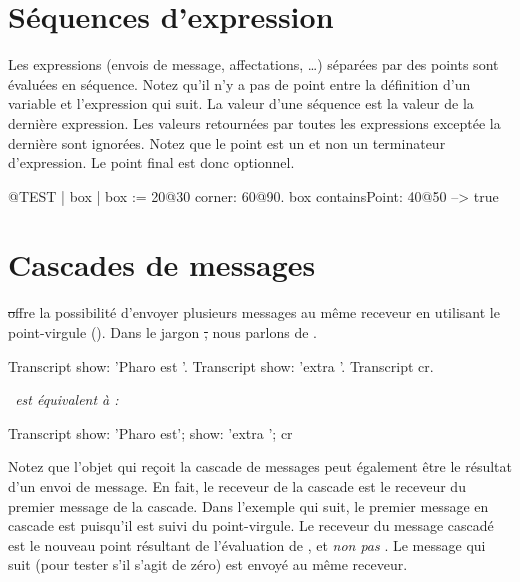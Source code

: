 \documentclass[a4paper,10pt,twoside]{book}
\begin{document}
\section{Séquences d'expression}
Les expressions (\ie envois de message, affectations, \ldots) séparées par des points sont évaluées en séquence.
Notez qu'il n'y a pas de point entre la définition d'un variable et l'expression qui suit.
La valeur d'une séquence est la valeur de la dernière
expression. Les valeurs retournées par toutes les expressions
exceptée la dernière sont ignorées. Notez que le point est un 
et non un terminateur d'expression. Le point final est donc optionnel.

\begin{code}{@TEST}
| box |
box := 20@30 corner: 60@90.
box containsPoint: 40@50 --> true
\end{code}

\section{Cascades de messages}
\st offre la possibilité d'envoyer plusieurs messages au même
receveur en utilisant le point-virgule (\ct{;}). Dans le jargon \st,
nous parlons de .


\begin{minipage}{0.35\textwidth}
\begin{code}{}
Transcript show: 'Pharo est '.
Transcript show: 'extra '.
Transcript cr.
\end{code}
\end{minipage}
\emph{~est équivalent à :~}
\begin{minipage}{0.35\textwidth}
\begin{code}{}
Transcript        
   show: 'Pharo est';
   show: 'extra ';
   cr
\end{code}
\end{minipage}

Notez que l'objet qui reçoit la cascade de messages peut également être le résultat d'un envoi de message.
En fait, le receveur de la cascade est le receveur du premier message
de la cascade. Dans l'exemple qui suit, le premier message en cascade
est  puisqu'il est suivi du point-virgule. Le receveur
du message cascadé  est le nouveau point résultant
de l'évaluation de , et \emph{non pas} . Le
message qui suit  (pour tester s'il s'agit de zéro) est
envoyé au même receveur. 
\end{document}
